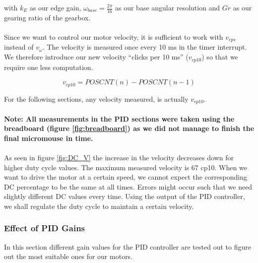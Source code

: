 \noindent
with $k_E$ as our edge gain, $\omega_{base} = \frac{2\pi}{16}$ as our base angular resolution and $Gr$ as our gearing ratio of the gearbox.
\\\\
Since we want to control our motor velocity, it is sufficient to work with $v_{cps}$ instead of $v_{\omega}$. 
The velocity is measured once every 10 ms in the timer interrupt.
We therefore introduce our new velocity ``clicks per 10 ms'' ($v_{cp10}$) so that we require one less computation.

$$v_{cp10} = POSCNT(n) - POSCNT(n-1)$$

\noindent
For the following sections, any velocity measured, is actually $v_{cp10}$.
\\\\
\textbf{Note: All measurements in the PID sections were taken using the breadboard (figure \ref{fig:breadboard}) as we did not manage to finish the final micromouse in time.}
\\\\
As seen in figure \ref{fig:DC_V} the increase in the velocity decreases down for higher duty cycle values. The maximum measured velocity is 67 cp10. When we want to drive the motor at a certain speed, we cannot expect the corresponding DC percentage to be the same at all times. Errors might occur such that we need slightly different DC values every time.
Using the output of the PID controller, we shall regulate the duty cycle to maintain a certain velocity.

\subsubsection{Effect of PID Gains}
In this section different gain values for the PID controller are tested out to figure out the most suitable ones for our motors.
